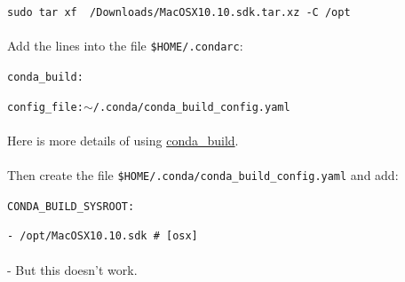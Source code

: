 \texttt{sudo tar xf ~/Downloads/MacOSX10.10.sdk.tar.xz -C /opt}
\\
\\
Add the lines into the file \texttt{\$HOME/.condarc}:

\indent \texttt{conda\_build:}

\indent \indent \texttt{config\_file:$\sim$/.conda/conda\_build\_config.yaml}
\\
\\
Here is more details of using \href{https://docs.conda.io/projects/conda/en/latest/user-guide/configuration/use-condarc.html#specify-root-dir}{conda\_build}.
\\
\\
Then create the file \texttt{\$HOME/.conda/conda\_build\_config.yaml} and add:
 
\indent \texttt{CONDA\_BUILD\_SYSROOT:}
 
\indent \indent \texttt{- /opt/MacOSX10.10.sdk        \# [osx]}
\\
\\
 - But this doesn't work.
\clearpage

